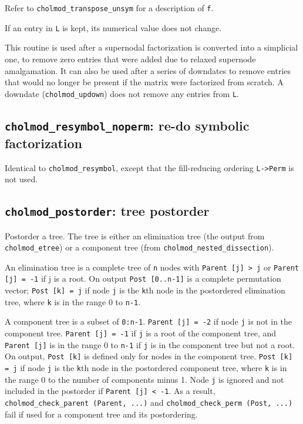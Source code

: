 \documentclass[11pt]{article}
\begin{document}
Refer to {\tt cholmod\_transpose\_unsym} for a description of {\tt f}.

If an entry in {\tt L} is kept, its numerical value does not change.

This routine is used after a supernodal factorization is converted into
a simplicial one, to remove zero entries that were added due to relaxed
supernode amalgamation.  It can also be used after a series of downdates
to remove entries that would no longer be present if the matrix were
factorized from scratch.  A downdate ({\tt cholmod\_updown}) does not remove any
entries from {\tt L}.

\subsection{{\tt cholmod\_resymbol\_noperm}: re-do symbolic factorization}


Identical to {\tt cholmod\_resymbol}, except that the fill-reducing
ordering {\tt L->Perm} is not used.

\subsection{{\tt cholmod\_postorder}: tree postorder}


Postorder a tree.  The tree is either an elimination tree (the output from
{\tt cholmod\_etree}) or a component tree (from {\tt cholmod\_nested\_dissection}).

An elimination tree is a complete tree of {\tt n} nodes with {\tt Parent [j] > j} or
{\tt Parent [j] = -1} if j is a root.  On output {\tt Post [0..n-1]} is a complete
permutation vector;
{\tt Post [k] = j} if node {\tt j} is the {\tt k}th node in the
postordered elimination tree, where {\tt k} is in the range 0 to {\tt n-1}.

A component tree is a subset of {\tt 0:n-1}.  {\tt Parent [j] = -2} if node {\tt j} is not
in the component tree.  {\tt Parent [j] = -1} if {\tt j} is a root of the component
tree, and {\tt Parent [j]} is in the range 0 to {\tt n-1} if {\tt j} is in the component
tree but not a root.  On output, {\tt Post [k]} is defined only for nodes in
the component tree.  {\tt Post [k] = j} if node {\tt j} is the {\tt k}th node in the
postordered component tree, where {\tt k} is in the range 0 to the number of
components minus 1.
Node {\tt j} is ignored and not included in the postorder if {\tt Parent [j] < -1}.
As a result, {\tt cholmod\_check\_parent (Parent, ...)} and {\tt cholmod\_check\_perm (Post, ...)}
fail if used for a component tree and its postordering.
\end{document}

